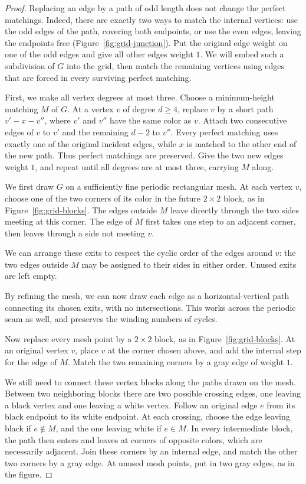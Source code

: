 \documentclass[11pt]{article}
\theoremstyle{definition}
\theoremstyle{remark}
\begin{document}
\begin{proof}

Replacing an edge by a path of odd length does not
change the perfect matchings. Indeed, there are exactly
two ways to match the internal vertices: use the odd
edges of the path, covering both endpoints, or use
the even edges, leaving the endpoints free
(Figure~\ref{fig:grid-junction}). Put the original
edge weight on one of the odd edges and give all
other edges weight $1$. We will embed such a subdivision of $G$ into
the grid, then match the remaining vertices
using edges that are forced in every surviving
perfect matching.

First, we make all vertex degrees at most three.
Choose a minimum-height matching $M$ of $G$.
At a vertex $v$ of degree $d\ge4$, replace $v$
by a short path $v'-x-v''$, where $v'$ and $v''$
have the same color as $v$. Attach two consecutive
edges of $v$ to $v'$ and the remaining $d-2$ to
$v''$. Every perfect matching uses exactly one
of the original incident edges, while $x$ is
matched to the other end of the new path.
Thus perfect matchings are preserved. Give the
two new edges weight $1$, and repeat until all
degrees are at most three, carrying $M$ along.



We first draw $G$ on a sufficiently fine periodic
rectangular mesh. At each vertex $v$, choose one
of the two corners of its color in the future
$2\times2$ block, as in Figure~\ref{fig:grid-blocks}.
The edges outside $M$ leave directly through
the two sides meeting at this corner. The edge
of $M$ first takes one step to an adjacent corner,
then leaves through a side not meeting $v$.

We can arrange these exits to respect the cyclic
order of the edges around $v$: the two edges
outside $M$ may be assigned to their sides in
either order. Unused exits are left empty.

By refining the mesh, we can now draw each edge
as a horizontal-vertical path connecting its
chosen exits, with no intersections. This works
across the periodic seam as well, and preserves
the winding numbers of cycles.


Now replace every mesh point by a $2\times2$ block,
as in Figure~\ref{fig:grid-blocks}. At an original vertex $v$, place $v$ at the corner
chosen above, and add the internal step for the
edge of $M$. Match the two
remaining corners by a gray edge of weight $1$.

We still need to connect these vertex blocks along
the paths drawn on the mesh. Between two neighboring
blocks there are two possible crossing edges, one
leaving a black vertex and one leaving a white
vertex. Follow an original edge $e$ from its black
endpoint to its white endpoint. At each crossing,
choose the edge leaving black if $e\notin M$, and
the one leaving white if $e\in M$. In every
intermediate block, the path then enters and
leaves at corners of opposite colors, which
are necessarily adjacent. Join these corners
by an internal edge, and match the other two
corners by a gray edge. At unused mesh points,
put in two gray edges, as in the figure.


\end{proof}
\end{document}
